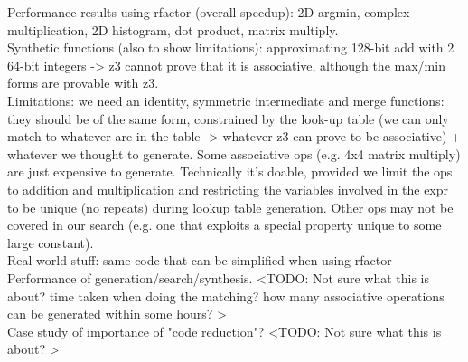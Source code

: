 Performance results using rfactor (overall speedup): 2D argmin, complex multiplication, 2D histogram, dot product, matrix multiply. \\

Synthetic functions (also to show limitations): approximating 128-bit add with 2 64-bit integers -> z3 cannot prove that it is associative, although the max/min forms are provable with z3. \\

Limitations: we need an identity, symmetric intermediate and merge functions: they should be of the same form, constrained by the look-up table (we can only match to whatever are in the table -> whatever z3 can prove to be associative) + whatever we thought to generate. Some associative ops (e.g. 4x4 matrix multiply) are just expensive to generate. Technically it's doable, provided we limit the ops to addition and multiplication and restricting the variables involved in the expr to be unique (no repeats) during lookup table generation. Other ops may not be covered in our search (e.g. one that exploits a special property unique to some large constant). \\

Real-world stuff: same code that can be simplified when using rfactor \\

Performance of generation/search/synthesis. <TODO: Not sure what this is about? time taken when doing the matching? how many associative operations can be generated within some hours? > \\

Case study of importance of "code reduction"? <TODO: Not sure what this is about? > \\ 
